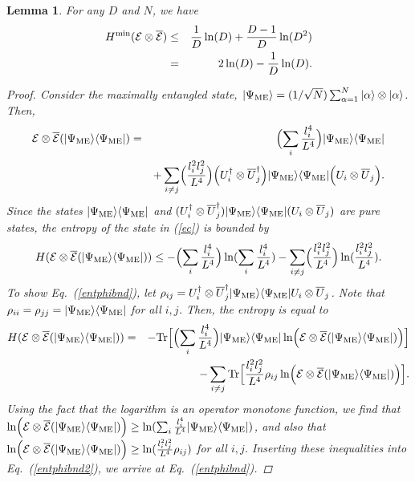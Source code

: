 \documentclass[aps,prl,amsmath,amssymb,amsfonts,superscriptaddress,floatfix]{revtex4}
\newtheorem{lemma}{Lemma}
\newcommand{\ME}{\Psi_{\rm ME}}
\newcommand{\be}{\begin{equation}}
\newcommand{\ee}{\end{equation}}
\begin{document}
\begin{lemma}
\label{lowent}
For any $D$ and $N$, we have
\begin{eqnarray}
\label{cres}
H^{\rm min}({\cal E}\otimes \overline {\cal E})&\leq &
\frac{1}{D} \ln(D)+\frac{D-1}{D} \ln(D^2)
\\ \nonumber
&=&
2\ln(D)-\frac{1}{D} \ln(D).
\end{eqnarray}
\begin{proof}
Consider the maximally entangled state, $|\ME\rangle=(1/\sqrt{N}) \sum_{\alpha=1}^N
|\alpha\rangle\otimes |\alpha\rangle$.  Then,
\begin{eqnarray}
\label{ec}
{\cal E}\otimes\overline{\cal E}(|\ME\rangle\langle\ME|)&=&
\Bigl(\sum_i \frac{l_i^4}{L^4}\Bigr)
|\ME\rangle\langle\ME| \\ \nonumber
&& +\sum_{i \neq j}
\Bigl(\frac{l_i^2 l_j^2}{L^4}\Bigr)
\Bigl( U^{\dagger}_i \otimes \overline U^{\dagger}_j\Bigr)
|\ME\rangle\langle\ME|
\Bigl( U_i \otimes \overline U_j\Bigr).
\end{eqnarray}
Since the states $|\ME\rangle\langle\ME|$ and
$(U^{\dagger}_i \otimes \overline U^{\dagger}_j)
|\ME\rangle\langle\ME|
(U_i \otimes \overline U_j)$ are pure states, the entropy of
the state in (\ref{ec}) is bounded by
\be
\label{entphibnd}
H({\cal E}\otimes\overline{\cal E}(|\ME\rangle\langle\ME|))
\leq
-\Bigl(\sum_i \frac{l_i^4}{L^4}\Bigr) \ln(
\sum_i \frac{l_i^4}{L^4})
-\sum_{i\neq j}
\Bigl(\frac{l_i^2 l_j^2}{L^4}\Bigr)
\ln(\frac{l_i^2 l_j^2}{L^4})
.
\ee
To show Eq.~(\ref{entphibnd}),
let $\rho_{ij}=
 U^{\dagger}_i \otimes \overline U^{\dagger}_j
|\ME\rangle\langle\ME|
 U_i \otimes \overline U_j$.  Note that
$\rho_{ii}=\rho_{jj}=|\ME\rangle\langle\ME |$
for all $i,j$.  Then, the entropy is equal to
\begin{eqnarray}
\label{entphibnd2}
H({\cal E}\otimes\overline{\cal E}(|\ME\rangle\langle\ME|))
&=&
-{\rm Tr}\Bigl[\Bigl(\sum_i \frac{l_i^4}{L^4}\Bigr) |\ME\rangle\langle\ME | \ln\Bigl(
{\cal E}\otimes\overline{\cal E}(|\ME\rangle\langle\ME|)
\Bigr)\Bigr]
\\ \nonumber
&&-
\sum_{i\neq j}{\rm Tr}\Bigl[\frac{l_i^2 l_j^2}{L^4} \rho_{ij} \ln\Bigl(
{\cal E}\otimes\overline{\cal E}(|\ME\rangle\langle\ME|)\Bigr)\Bigr].
\end{eqnarray}
Using the fact that the logarithm is an operator monotone function\cite{opmon},
we find
that $\ln\Bigl(
{\cal E}\otimes\overline{\cal E}(|\ME\rangle\langle\ME|)\Bigr)
\geq \ln(
\sum_i \frac{l_i^4}{L^4}|\ME\rangle\langle\ME|)$,
and also
that $\ln\Bigl(
{\cal E}\otimes\overline{\cal E}(|\ME\rangle\langle\ME|)\Bigr)
\geq \ln(
\frac{l_i^2 l_j^2}{L^4} \rho_{ij})$ for all $i,j$.
Inserting these inequalities into Eq.~(\ref{entphibnd2}), we
arrive at Eq.~(\ref{entphibnd}).


\end{proof}
\end{lemma}
\end{document}
